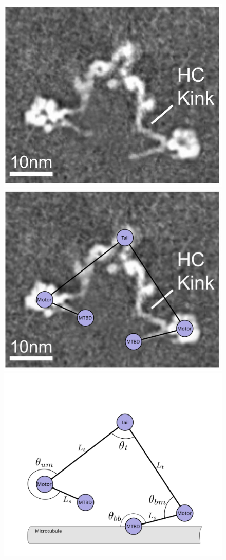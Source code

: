 \documentclass[9pt,twocolumn,twoside]{pnas-new}
\begin{document}
\begin{figure}%
  \centering
   \includegraphics[width=0.3\columnwidth]{figures/schematic-1-cryoem}
   \includegraphics[width=0.3\columnwidth]{figures/schematic-1-superimposed}
   \includegraphics[width=0.3\columnwidth]{figures/schematic-1-model}


\end{figure}
\end{document}
